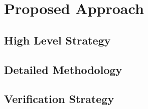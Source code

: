 \chapter[Chapter 2]{Proposed Approach}
\label{chap:proposed_approach}

\section{High Level Strategy}
\label{sec:high_level_strategy}

\section{Detailed Methodology}
\label{sec:detailed_methodology}

\section{Verification Strategy}
\label{sec:verification_strategy}

\renewcommand\thefigure{\thechapter .\arabic{figure}}
